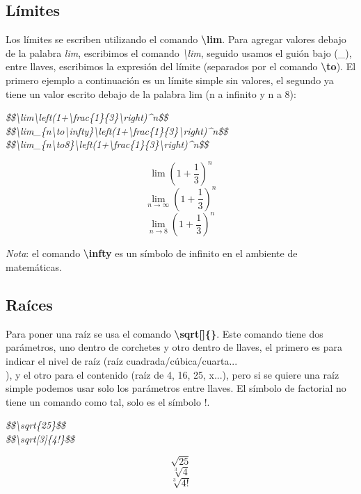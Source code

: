 \subsection{Límites}

Los límites se escriben utilizando el comando \textbf{\textbackslash{lim}}. Para agregar valores debajo de la palabra \textit{lim}, escribimos el comando \textit{\textbackslash{lim}}, seguido usamos el guión bajo (\_), entre llaves, escribimos la expresión del límite (separados por el comando \textbf{\textbackslash{to}}). El primero ejemplo a continuación es  un límite simple sin valores, el segundo ya tiene un valor escrito debajo de la palabra lim (n a infinito y n a 8):
\begin{center}
    \textit{
        \$\$\textbackslash{lim}\textbackslash{left}(1+\textbackslash{frac\{1\}\{3\}}\textbackslash{right})\textasciicircum n\$\$ \\
        \$\$\textbackslash{lim}\_\{n\textbackslash{to}\textbackslash{infty}\}\textbackslash{left}(1+\textbackslash{frac\{1\}\{3\}}\textbackslash{right})\textasciicircum n\$\$ \\
        \$\$\textbackslash{lim}\_\{n\textbackslash{to}8\}\textbackslash{left}(1+\textbackslash{frac\{1\}\{3\}}\textbackslash{right})\textasciicircum n\$\$
    }
\end{center}
$$\lim \left(1+\frac{1}{3}\right)^n$$
$$\lim_{n\to\infty} \left(1+\frac{1}{3}\right)^n$$
$$\lim_{n\to8} \left(1+\frac{1}{3}\right)^n$$

\textit{Nota}: el comando \textbf{\textbackslash{infty}} es un símbolo de infinito en el ambiente de matemáticas.


\subsection{Raíces}

Para poner una raíz se usa el comando \textbf{\textbackslash{sqrt[]\{\}}}. Este comando tiene dos parámetros, uno dentro de corchetes y otro dentro de llaves, el primero es para indicar el nivel de raíz (raíz cuadrada/cúbica/cuarta...\\), y el otro para el contenido (raíz de 4, 16, 25, x...), pero si se quiere una raíz simple podemos usar solo los parámetros entre llaves. El símbolo de factorial no tiene un comando como tal, solo es el símbolo !.
\begin{center}
    \textit{
        \$\$\textbackslash{sqrt\{25\}}\$\$ \\
        \$\$\textbackslash{sqrt[3]\{4!\}}\$\$
    }
\end{center}
$$\sqrt{25}$$
$$\sqrt[3]{4}$$
$$\sqrt[3]{4!}$$


